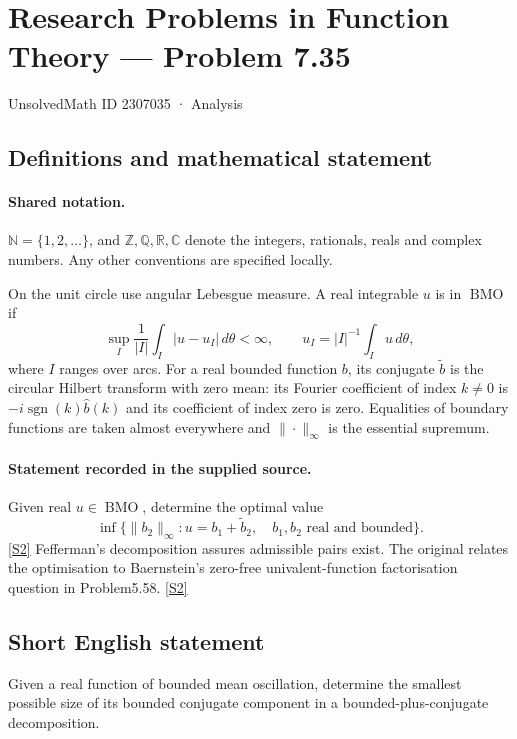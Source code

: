 \documentclass[11pt]{article}
\newcommand{\sref}[2]{\hyperlink{source:#1:#2}{[S#2]}}
\begin{document}
\setcounter{section}{2307034}
\section{Research Problems in Function Theory — Problem 7.35}\label{2307035}
{\small\sffamily UnsolvedMath ID 2307035 · Analysis}
\subsection{Definitions and mathematical statement}

\paragraph{Shared notation.}$\mathbb N=\{1,2,\ldots\}$, and $\mathbb Z,\mathbb Q,\mathbb R,\mathbb C$ denote the integers, rationals, reals and complex numbers. Any other conventions are specified locally.


On the unit circle use angular Lebesgue measure. A real integrable $u$ is in $\operatorname{BMO}$ if
\[\sup_I\frac1{|I|}\int_I|u-u_I|\,d\theta<\infty,\qquad
u_I=|I|^{-1}\int_Iu\,d\theta,
\]
where $I$ ranges over arcs. For a real bounded function $b$, its conjugate $\widetilde b$ is the circular Hilbert transform with zero mean: its Fourier coefficient of index $k\ne0$ is $-i\operatorname{sgn}(k)\widehat b(k)$ and its coefficient of index zero is zero. Equalities of boundary functions are taken almost everywhere and $\|\cdot\|_\infty$ is the essential supremum.

\paragraph{Statement recorded in the supplied source.}
Given real $u\in\operatorname{BMO}$, determine the optimal value
\[\inf\{\|b_2\|_\infty:u=b_1+\widetilde b_2,\quad b_1,b_2\text{ real and bounded}\}.\] \sref{2307035}{2}
Fefferman's decomposition assures admissible pairs exist. The original relates the optimisation to Baernstein's zero-free univalent-function factorisation question in Problem5.58. \sref{2307035}{2}
\subsection{Short English statement}
Given a real function of bounded mean oscillation, determine the smallest possible size of its bounded conjugate component in a bounded-plus-conjugate decomposition.
\end{document}
